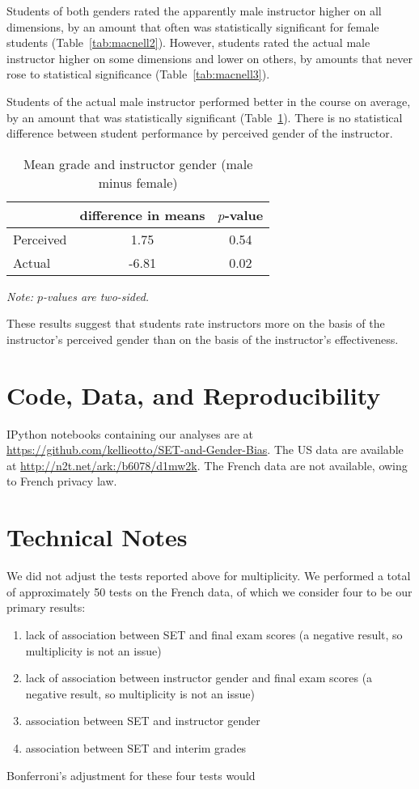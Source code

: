 \documentclass[12pt]{article}
\newcommand{\todo}[1]{{\color{red}{TO DO: \sc #1}}}
\begin{document}
Students of both genders rated the apparently male instructor higher on all
dimensions, by an amount that often was statistically significant for female students 
(Table~\ref{tab:macnell2}).
However, students rated the actual male instructor higher on some dimensions
and lower on others, by amounts that never rose to statistical significance
(Table~\ref{tab:macnell3}). 

Students of the actual male instructor performed better in the course on average,
by an amount that was statistically significant (Table~\ref{tab:macnell4}). 
There is no statistical difference between student performance by 
perceived gender of the instructor. 

\begin{table}[htbp]
  \centering
  \footnotesize 
  \caption{Mean grade and instructor gender (male minus female)}
    \begin{tabular}{lcc}
    \toprule 
                     & difference in means   & $p$-value    \\
   \midrule
    Perceived &         1.75       & 0.54      \\
    Actual  &            -6.81       & 0.02      \\
    \bottomrule
    \end{tabular}%
 \label{tab:macnell4}%
 
\textit{Note: $p$-values are two-sided.}
\end{table}%
\normalsize

These results suggest that students rate instructors more on the basis of the 
instructor's perceived gender than on the basis of the instructor's effectiveness. 

\section{Code, Data, and Reproducibility}
IPython notebooks containing our analyses are at
\url{https://github.com/kellieotto/SET-and-Gender-Bias}.
The US data are available at \url{http://n2t.net/ark:/b6078/d1mw2k}.
The French data are not available, owing to French privacy law.

\section{Technical Notes}
We did not adjust the tests reported above for multiplicity.
We performed a total of approximately 50 tests on the French data, of which we
consider four to be our primary results:
\begin{enumerate}
    \item lack of association between SET and final exam scores (a negative result,
               so multiplicity is not an issue)
    \item lack of association between instructor gender and final exam scores (a negative result,
               so multiplicity is not an issue)
    \item association between SET and instructor gender
    \item association between SET and interim grades
\end{enumerate}        
Bonferroni's adjustment for these four tests would \todo{fix me when the results are in}
\end{document}
